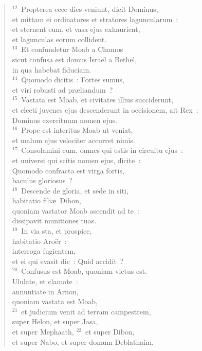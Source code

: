 \begin{flushleft}
\begin{verse}
${}^{12}$~Propterea ecce dies veniunt, dicit Dominus,\\ et mittam ei ordinatores et stratores laguncularum~:\\ et sternent eum, et vasa ejus exhaurient,\\ et lagunculas eorum collident.\\
${}^{13}$~Et confundetur Moab a Chamos\\ sicut confusa est domus Isra\"el a Bethel,\\ in qua habebat fiduciam.\\
${}^{14}$~Quomodo dicitis~: Fortes sumus,\\ et viri robusti ad pr\ae liandum~?\\
${}^{15}$~Vastata est Moab, et civitates illius succiderunt,\\ et electi juvenes ejus descenderunt in occisionem, ait Rex~:\\ Dominus exercituum nomen ejus.\\
${}^{16}$~Prope est interitus Moab ut veniat,\\ et malum ejus velociter accurret nimis.\\
${}^{17}$~Consolamini eum, omnes qui estis in circuitu ejus~:\\ et universi qui scitis nomen ejus, dicite~:\\ Quomodo confracta est virga fortis,\\ baculus gloriosus~?\\
${}^{18}$~Descende de gloria, et sede in siti,\\ habitatio fili\ae\ Dibon,\\ quoniam vastator Moab ascendit ad te~:\\ dissipavit munitiones tuas.\\
${}^{19}$~In via sta, et prospice,\\ habitatio Aro\"er~:\\ interroga fugientem,\\ et ei qui evasit dic~: Quid accidit~?\\
${}^{20}$~Confusus est Moab, quoniam victus est.\\ Ululate, et clamate~:\\ annuntiate in Arnon,\\ quoniam vastata est Moab,\\
${}^{21}$~et judicium venit ad terram campestrem,\\ super Helon, et super Jasa,\\ et super Mephaath,
${}^{22}$~et super Dibon,\\ et super Nabo, et super domum Deblathaim,\\

\end{verse}
\end{flushleft}
